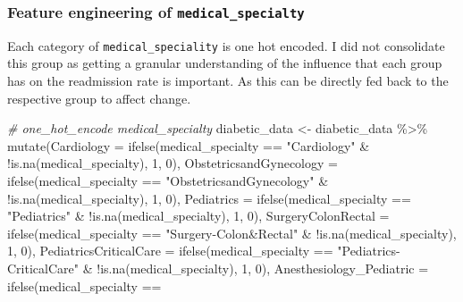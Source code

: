 \documentclass[
]{article}
\newenvironment{Shaded}{\begin{snugshade}}{\end{snugshade}}
\newcommand{\AttributeTok}[1]{\textcolor[rgb]{0.77,0.63,0.00}{#1}}
\newcommand{\CommentTok}[1]{\textcolor[rgb]{0.56,0.35,0.01}{\textit{#1}}}
\newcommand{\DecValTok}[1]{\textcolor[rgb]{0.00,0.00,0.81}{#1}}
\newcommand{\FunctionTok}[1]{\textcolor[rgb]{0.00,0.00,0.00}{#1}}
\newcommand{\NormalTok}[1]{#1}
\newcommand{\OtherTok}[1]{\textcolor[rgb]{0.56,0.35,0.01}{#1}}
\newcommand{\SpecialCharTok}[1]{\textcolor[rgb]{0.00,0.00,0.00}{#1}}
\newcommand{\StringTok}[1]{\textcolor[rgb]{0.31,0.60,0.02}{#1}}
\begin{document}
\hypertarget{feature-engineering-of-medical_specialty}{%
\subsubsection{\texorpdfstring{Feature engineering of
\texttt{medical\_specialty}}{Feature engineering of medical\_specialty}}\label{feature-engineering-of-medical_specialty}}

Each category of \texttt{medical\_speciality} is one hot encoded. I did
not consolidate this group as getting a granular understanding of the
influence that each group has on the readmission rate is important. As
this can be directly fed back to the respective group to affect change.

\begin{Shaded}
\begin{Highlighting}[]
\CommentTok{\# one\_hot\_encode medical\_specialty}
\NormalTok{diabetic\_data }\OtherTok{\textless{}{-}}\NormalTok{ diabetic\_data }\SpecialCharTok{\%\textgreater{}\%}
    \FunctionTok{mutate}\NormalTok{(}\AttributeTok{Cardiology =} \FunctionTok{ifelse}\NormalTok{(medical\_specialty }\SpecialCharTok{==}
        \StringTok{"Cardiology"} \SpecialCharTok{\&} \SpecialCharTok{!}\FunctionTok{is.na}\NormalTok{(medical\_specialty), }\DecValTok{1}\NormalTok{,}
        \DecValTok{0}\NormalTok{), }\AttributeTok{ObstetricsandGynecology =} \FunctionTok{ifelse}\NormalTok{(medical\_specialty }\SpecialCharTok{==}
        \StringTok{"ObstetricsandGynecology"} \SpecialCharTok{\&} \SpecialCharTok{!}\FunctionTok{is.na}\NormalTok{(medical\_specialty),}
        \DecValTok{1}\NormalTok{, }\DecValTok{0}\NormalTok{), }\AttributeTok{Pediatrics =} \FunctionTok{ifelse}\NormalTok{(medical\_specialty }\SpecialCharTok{==}
        \StringTok{"Pediatrics"} \SpecialCharTok{\&} \SpecialCharTok{!}\FunctionTok{is.na}\NormalTok{(medical\_specialty), }\DecValTok{1}\NormalTok{,}
        \DecValTok{0}\NormalTok{), }\AttributeTok{SurgeryColonRectal =} \FunctionTok{ifelse}\NormalTok{(medical\_specialty }\SpecialCharTok{==}
        \StringTok{"Surgery{-}Colon\&Rectal"} \SpecialCharTok{\&} \SpecialCharTok{!}\FunctionTok{is.na}\NormalTok{(medical\_specialty),}
        \DecValTok{1}\NormalTok{, }\DecValTok{0}\NormalTok{), }\AttributeTok{PediatricsCriticalCare =} \FunctionTok{ifelse}\NormalTok{(medical\_specialty }\SpecialCharTok{==}
        \StringTok{"Pediatrics{-}CriticalCare"} \SpecialCharTok{\&} \SpecialCharTok{!}\FunctionTok{is.na}\NormalTok{(medical\_specialty),}
        \DecValTok{1}\NormalTok{, }\DecValTok{0}\NormalTok{), }\AttributeTok{Anesthesiology\_Pediatric =} \FunctionTok{ifelse}\NormalTok{(medical\_specialty }\SpecialCharTok{==}

\end{Highlighting}
\end{Shaded}
\end{document}
